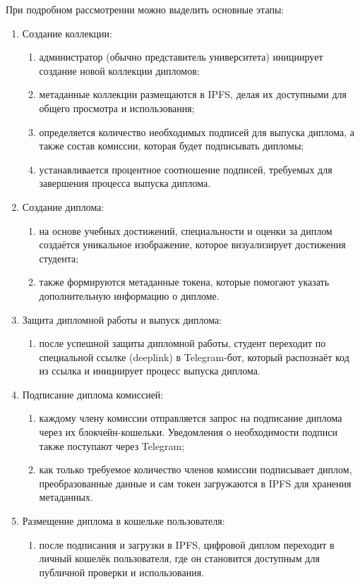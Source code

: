 При подробном рассмотрении можно выделить основные этапы:

\begin{enumerate}
    \item Создание коллекции:
    \begin{enumerate}
        \item администратор (обычно представитель университета) инициирует создание новой коллекции дипломов;
        \item метаданные коллекции размещаются в IPFS, делая их доступными для общего просмотра и использования;
        \item определяется количество необходимых подписей для выпуска диплома, а также состав комиссии, которая будет подписывать дипломы;
        \item устанавливается процентное соотношение подписей, требуемых для завершения процесса выпуска диплома.
    \end{enumerate}
    \item Создание диплома:
    \begin{enumerate}
        \item на основе учебных достижений, специальности и оценки за диплом создаётся уникальное изображение, которое визуализирует достижения студента;
        \item также формируются метаданные токена, которые помогают указать дополнительную информацию о дипломе.
    \end{enumerate}
    \item Защита дипломной работы и выпуск диплома:
    \begin{enumerate}
        \item после успешной защиты дипломной работы, студент переходит по специальной ссылке (deeplink) в Telegram-бот, который распознаёт код из ссылка и инициирует процесс выпуска диплома.
    \end{enumerate}
    \item Подписание диплома комиссией:
    \begin{enumerate}
        \item каждому члену комиссии отправляется запрос на подписание диплома через их блокчейн-кошельки. Уведомления о необходимости подписи также поступают через Telegram;
        \item как только требуемое количество членов комиссии подписывает диплом, преобразованные данные и сам токен загружаются в IPFS для хранения метаданных.
    \end{enumerate}
    \item Размещение диплома в кошельке пользователя:
    \begin{enumerate}
        \item после подписания и загрузки в IPFS, цифровой диплом переходит в личный кошелёк пользователя, где он становится доступным для публичной проверки и использования.
    \end{enumerate}
\end{enumerate}

